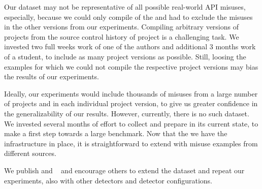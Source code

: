 Our dataset may not be representative of all possible real-world API misuses, especially, because we could only compile  of the  and had to exclude the misuses in the other versions from our experiments.
Compiling arbitrary versions of projects from the source control history of project is a challenging task.
We invested two full weeks work of one of the authors and additional 3 months work of a student, to include as many project versions as possible.
Still, loosing the examples for which we could not compile the respective project versions may bias the results of our experiments.

Ideally, our experiments would include thousands of misuses from a large number of projects and in each individual project version, to give us greater confidence in the generalizability of our results.
However, currently, there is no such dataset.
We invested several months of effort to collect and prepare \MUBench in its current state, to make a first step towards a large benchmark.
Now that the we have the infrastructure in place, it is straightforward to extend \MUBench with misuse examples from different sources.

We publish \MUPipe and \MUBench~\cite{mubench} and encourage others to extend the dataset and repeat our experiments, also with other detectors and detector configurations.
